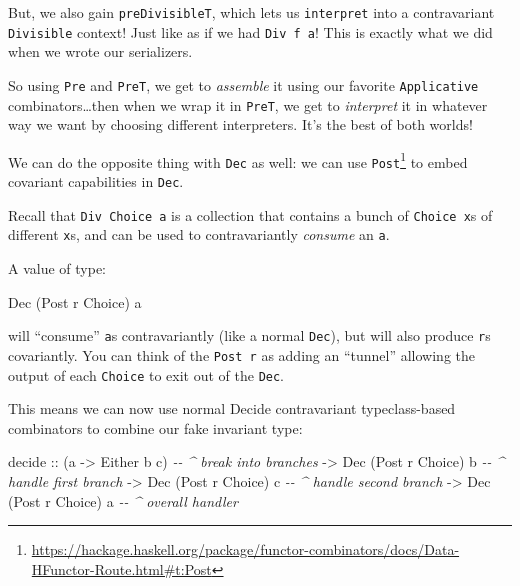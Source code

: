 \documentclass[]{article}
\newenvironment{Shaded}{}{}
\newcommand{\CommentTok}[1]{\textcolor[rgb]{0.38,0.63,0.69}{\textit{#1}}}
\newcommand{\DataTypeTok}[1]{\textcolor[rgb]{0.56,0.13,0.00}{#1}}
\newcommand{\NormalTok}[1]{#1}
\newcommand{\OtherTok}[1]{\textcolor[rgb]{0.00,0.44,0.13}{#1}}
\renewcommand{\href}[2]{#2\footnote{\url{#1}}}
\begin{document}
But, we also gain \texttt{preDivisibleT}, which lets us \texttt{interpret} into
a contravariant \texttt{Divisible} context! Just like as if we had
\texttt{Div\ f\ a}! This is exactly what we did when we wrote our serializers.

So using \texttt{Pre} and \texttt{PreT}, we get to \emph{assemble} it using our
favorite \texttt{Applicative} combinators\ldots then when we wrap it in
\texttt{PreT}, we get to \emph{interpret} it in whatever way we want by choosing
different interpreters. It's the best of both worlds!

We can do the opposite thing with \texttt{Dec} as well: we can use
\href{https://hackage.haskell.org/package/functor-combinators/docs/Data-HFunctor-Route.html\#t:Post}{\texttt{Post}}
to embed covariant capabilities in \texttt{Dec}.

Recall that \texttt{Div\ Choice\ a} is a collection that contains a bunch of
\texttt{Choice\ x}s of different \texttt{x}s, and can be used to contravariantly
\emph{consume} an \texttt{a}.

A value of type:

\begin{Shaded}
\begin{Highlighting}[]
\DataTypeTok{Dec}\NormalTok{ (}\DataTypeTok{Post}\NormalTok{ r }\DataTypeTok{Choice}\NormalTok{) a}
\end{Highlighting}
\end{Shaded}

will ``consume'' \texttt{a}s contravariantly (like a normal \texttt{Dec}), but
will also produce \texttt{r}s covariantly. You can think of the \texttt{Post\ r}
as adding an ``tunnel'' allowing the output of each \texttt{Choice} to exit out
of the \texttt{Dec}.

This means we can now use normal Decide contravariant typeclass-based
combinators to combine our fake invariant type:

\begin{Shaded}
\begin{Highlighting}[]
\NormalTok{decide}
\OtherTok{    ::}\NormalTok{ (a }\OtherTok{{-}>} \DataTypeTok{Either}\NormalTok{ b c)        }\CommentTok{{-}{-} \^{} break into branches}
    \OtherTok{{-}>} \DataTypeTok{Dec}\NormalTok{ (}\DataTypeTok{Post}\NormalTok{ r }\DataTypeTok{Choice}\NormalTok{) b    }\CommentTok{{-}{-} \^{} handle first branch}
    \OtherTok{{-}>} \DataTypeTok{Dec}\NormalTok{ (}\DataTypeTok{Post}\NormalTok{ r }\DataTypeTok{Choice}\NormalTok{) c    }\CommentTok{{-}{-} \^{} handle second branch}
    \OtherTok{{-}>} \DataTypeTok{Dec}\NormalTok{ (}\DataTypeTok{Post}\NormalTok{ r }\DataTypeTok{Choice}\NormalTok{) a    }\CommentTok{{-}{-} \^{} overall handler}
\end{Highlighting}
\end{Shaded}
\end{document}
